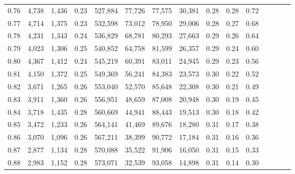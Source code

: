 \begin{tabular}{rrrcrrrrrrrrrrr}
0.76 &   4,738 &  1,436 &                                       0.23 &  527,884 &   77,726 &   77,575 &   30,381 &  0.28 &  0.28 &                         0.72 \\
0.77 &   4,714 &  1,375 &                                       0.23 &  532,598 &   73,012 &   78,950 &   29,006 &  0.28 &  0.27 &                         0.68 \\
0.78 &   4,231 &  1,343 &                                       0.24 &  536,829 &   68,781 &   80,293 &   27,663 &  0.29 &  0.26 &                         0.64 \\
0.79 &   4,023 &  1,306 &                                       0.25 &  540,852 &   64,758 &   81,599 &   26,357 &  0.29 &  0.24 &                         0.60 \\
0.80 &   4,367 &  1,412 &                                       0.24 &  545,219 &   60,391 &   83,011 &   24,945 &  0.29 &  0.23 &                         0.56 \\
0.81 &   4,150 &  1,372 &                                       0.25 &  549,369 &   56,241 &   84,383 &   23,573 &  0.30 &  0.22 &                         0.52 \\
0.82 &   3,671 &  1,265 &                                       0.26 &  553,040 &   52,570 &   85,648 &   22,308 &  0.30 &  0.21 &                         0.49 \\
0.83 &   3,911 &  1,360 &                                       0.26 &  556,951 &   48,659 &   87,008 &   20,948 &  0.30 &  0.19 &                         0.45 \\
0.84 &   3,718 &  1,435 &                                       0.28 &  560,669 &   44,941 &   88,443 &   19,513 &  0.30 &  0.18 &                         0.42 \\
0.85 &   3,472 &  1,233 &                                       0.26 &  564,141 &   41,469 &   89,676 &   18,280 &  0.31 &  0.17 &                         0.38 \\
0.86 &   3,070 &  1,096 &                                       0.26 &  567,211 &   38,399 &   90,772 &   17,184 &  0.31 &  0.16 &                         0.36 \\
0.87 &   2,877 &  1,134 &                                       0.28 &  570,088 &   35,522 &   91,906 &   16,050 &  0.31 &  0.15 &                         0.33 \\
0.88 &   2,983 &  1,152 &                                       0.28 &  573,071 &   32,539 &   93,058 &   14,898 &  0.31 &  0.14 &                         0.30 \\

\end{tabular}
